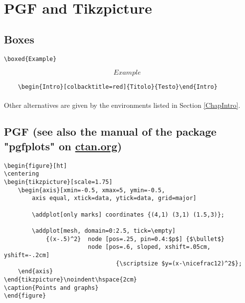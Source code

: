 \section{PGF and Tikzpicture}
\subsection{Boxes}
\begin{verbatim}
\boxed{Example}
\end{verbatim}
\[\boxed{Example}\]

\begin{verbatim}
	\begin{Intro}[colbacktitle=red]{Titolo}{Testo}\end{Intro}
\end{verbatim}

\paragraph*{}
Other alternatives are given by the environments listed in Section \ref{ChapIntro}.




\subsection{PGF (see also the manual of the package "pgfplots" on \texorpdfstring{\url{ctan.org}}{ctan.org})}

\begin{center}
\end{center}

\newpage
\begin{verbatim}
\begin{figure}[ht]
\centering
\begin{tikzpicture}[scale=1.75]
    \begin{axis}[xmin=-0.5, xmax=5, ymin=-0.5,
	    axis equal, xtick=data, ytick=data, grid=major]
        
        \addplot[only marks] coordinates {(4,1) (3,1) (1.5,3)};
   	    
        \addplot[mesh, domain=0:2.5, tick=\empty]
            {(x-.5)^2}  node [pos=.25, pin=0.4:$p$] {$\bullet$}
   	                    node [pos=.6, sloped, xshift=.05cm, yshift=-.2cm]
                                {\scriptsize $y=(x-\nicefrac12)^2$};
    \end{axis}
\end{tikzpicture}\noindent\hspace{2cm}
\caption{Points and graphs}
\end{figure}
\end{verbatim}

